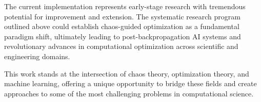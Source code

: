 \documentclass[11pt,a4paper]{article}
\begin{document}
The current implementation represents early-stage research with tremendous potential for improvement and extension. The systematic research program outlined above could establish chaos-guided optimization as a fundamental paradigm shift, ultimately leading to post-backpropagation AI systems and revolutionary advances in computational optimization across scientific and engineering domains.

This work stands at the intersection of chaos theory, optimization theory, and machine learning, offering a unique opportunity to bridge these fields and create approaches to some of the most challenging problems in computational science.
\end{document}
